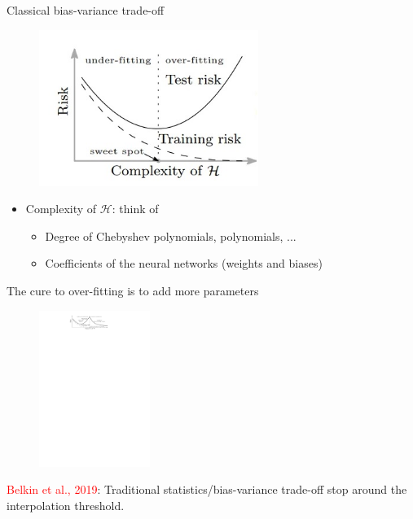 \documentclass[aspectratio=169,10pt]{beamer}
\begin{document}
\begin{frame}{Classical bias-variance trade-off}
	\begin{figure}[h!]
		\begin{center}
			\includegraphics[height=2.0in]{./figures/bias-variance}
		\end{center}
	\end{figure}
	\begin{itemize}
		\item Complexity of $\mathcal{H}$: think of
		\begin{itemize}
			\item Degree of Chebyshev polynomials, polynomials, ...
			\item Coefficients of the neural networks (weights and biases)
		\end{itemize}
	\end{itemize}
\end{frame}
		
				
\begin{frame}{The cure to over-fitting is to add more parameters}
		\begin{figure}[h!]
			\begin{center}
				\includegraphics[height=2.0in]{./figures/doubledescent.pdf}
			\end{center}
		\end{figure}
		\textcolor{red}{Belkin et al., 2019}: Traditional statistics/bias-variance trade-off stop around the interpolation threshold.		
\end{frame}
	
\end{document}
